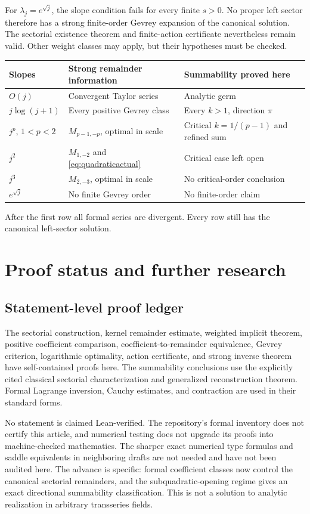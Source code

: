 \documentclass[11pt,a4paper]{article}
\numberwithin{equation}{section}
\theoremstyle{definition}\newtheorem{definition}[theorem]{Definition}
\theoremstyle{remark}\newtheorem{remark}[theorem]{Remark}
\begin{document}
For $\lambda_j=e^{\sqrt j}$, the slope condition fails for every finite
$s>0$. No proper left sector therefore has a strong finite-order Gevrey
expansion of the canonical solution. The sectorial existence theorem and
finite-action certificate nevertheless remain valid. Other weight
classes may apply, but their hypotheses must be checked.

\begin{center}\small
\begin{tabular}{@{}p{}p{}p{}@{}}
\toprule
Slopes & Strong remainder information & Summability proved here\\\midrule
$O(j)$ & Convergent Taylor series & Analytic germ\\
$j\log(j+1)$ & Every positive Gevrey class & Every $k>1$, direction $\pi$\\
$j^p$, $1<p<2$ & $M_{p-1,-p}$, optimal in scale & Critical $k=1/(p-1)$ and refined sum\\
$j^2$ & $M_{1,-2}$ and \eqref{eq:quadraticactual} & Critical case left open\\
$j^3$ & $M_{2,-3}$, optimal in scale & No critical-order conclusion\\
$e^{\sqrt j}$ & No finite Gevrey order & No finite-order claim\\\bottomrule
\end{tabular}
\end{center}
After the first row all formal series are divergent. Every row still
has the canonical left-sector solution.

\section{Proof status and further research}
\label{sec:future}
\subsection{Statement-level proof ledger}
The sectorial construction, kernel remainder estimate, weighted implicit
theorem, positive coefficient comparison, coefficient-to-remainder
equivalence, Gevrey criterion, logarithmic optimality, action certificate,
and strong inverse theorem have self-contained proofs here. The
summability conclusions use the explicitly cited classical sectorial
characterization and generalized reconstruction theorem. Formal Lagrange
inversion, Cauchy estimates, and contraction are used in their standard
forms.

No statement is claimed Lean-verified. The repository's formal inventory
does not certify this article, and numerical testing does not upgrade its
proofs into machine-checked mathematics. The sharper exact numerical
type formulas and saddle equivalents in neighboring drafts are not needed
and have not been audited here.
The advance is specific: formal coefficient classes now control the
canonical sectorial remainders, and the subquadratic-opening regime gives
an exact directional summability classification. This is not a solution
to analytic realization in arbitrary transseries fields.
\end{document}
